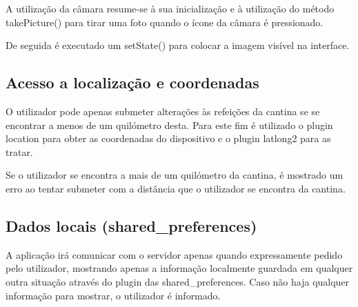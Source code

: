 \documentclass[10pt]{article}
\begin{document}
        A utilização da câmara resume-se à sua inicialização e à utilização do método takePicture() para tirar uma foto quando o ícone da câmara é pressionado.

        De seguida é executado um setState() para colocar a imagem visível na interface.
        
        \subsection{Acesso a localização e coordenadas}

        O utilizador pode apenas submeter alterações às refeições da cantina se se encontrar a menos de um quilómetro desta. Para este fim é utilizado o plugin location para obter as coordenadas do dispositivo e o plugin latlong2 para as tratar. 

        Se o utilizador se encontra a mais de um quilómetro da cantina, é mostrado um erro ao tentar submeter com a distância que o utilizador se encontra da cantina.

        \pagebreak

        \subsection{Dados locais (shared\_preferences)}\label{shared_preferences} 
        

		A aplicação irá comunicar com o servidor apenas quando expressamente pedido pelo utilizador, mostrando apenas a informação localmente guardada em qualquer outra situação através do plugin das shared\_preferences.
        Caso não haja qualquer informação para mostrar, o utilizador é informado.
\end{document}
